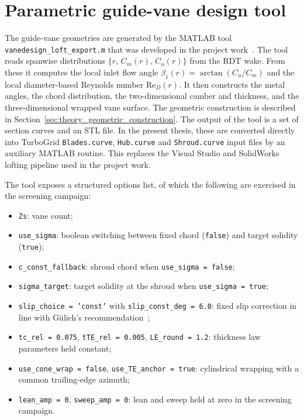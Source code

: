 \section{Parametric guide-vane design tool}
\label{sec:methods_matlab_tool}
 
The guide-vane geometries are generated by the MATLAB tool \texttt{vanedesign\_loft\_export.m} that was developed in the project work~\cite{Leonsen2025}. The tool reads spanwise distributions $\{r,\,C_m(r),\,C_u(r)\}$ from the RDT wake. From these it computes the local inlet flow angle $\beta_1(r) = \arctan(C_u/C_m)$ and the local diameter-based Reynolds number $\mathrm{Re}_D(r)$. It then constructs the metal angles, the chord distribution, the two-dimensional camber and thickness, and the three-dimensional wrapped vane surface. The geometric construction is described in Section~\ref{sec:theory_geometric_construction}. The output of the tool is a set of section curves and an STL file. In the present thesis, these are converted directly into TurboGrid \texttt{Blades.curve}, \texttt{Hub.curve} and \texttt{Shroud.curve} input files by an auxiliary MATLAB routine. This replaces the Visual Studio and SolidWorks lofting pipeline used in the project work.
 
The tool exposes a structured options list, of which the following are exercised in the screening campaign:
\begin{itemize}
  \item \texttt{Zs}: vane count;
  \item \texttt{use\_sigma}: boolean switching between fixed chord (\texttt{false}) and target solidity (\texttt{true});
  \item \texttt{c\_const\_fallback}: shroud chord when \texttt{use\_sigma = false};
  \item \texttt{sigma\_target}: target solidity at the shroud when \texttt{use\_sigma = true};
  \item \texttt{slip\_choice = 'const'} with \texttt{slip\_const\_deg = 6.0}: fixed slip correction in line with G\"ulich's recommendation~\cite{Gulich2010};
  \item \texttt{tc\_rel = 0.075}, \texttt{tTE\_rel = 0.005}, \texttt{LE\_round = 1.2}: thickness law parameters held constant;
  \item \texttt{use\_cone\_wrap = false}, \texttt{use\_TE\_anchor = true}: cylindrical wrapping with a common trailing-edge azimuth;
  \item \texttt{lean\_amp = 0}, \texttt{sweep\_amp = 0}: lean and sweep held at zero in the screening campaign.
\end{itemize}
 
